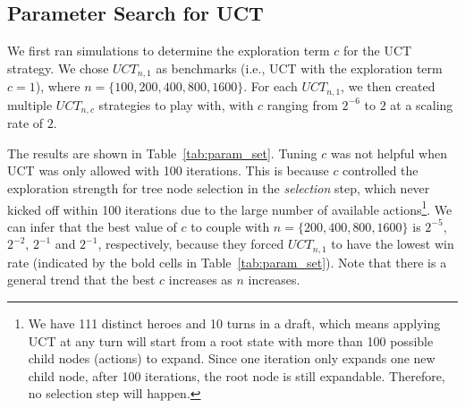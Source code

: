 \subsection{Parameter Search for UCT}

We first ran simulations to determine the exploration term $c$ for the UCT strategy. We chose $UCT_{n, 1}$ as benchmarks (i.e., UCT with the exploration term ${c=1}$), where ${n=\{100, 200, 400, 800, 1600\}}$. For each $UCT_{n,1}$, we then created multiple $UCT_{n, c}$ strategies to play with, with $c$ ranging from $2^{-6}$ to $2$ at a scaling rate of $2$.

The results are shown in Table~\ref{tab:param_set}. Tuning $c$ was not helpful when UCT was only allowed with 100 iterations. This is because $c$ controlled the exploration strength for tree node selection in the \textit{selection} step, which never kicked off within 100 iterations due to the large number of available actions\footnote{We have 111 distinct heroes and 10 turns in a draft, which means applying UCT at any turn will start from a root state with more than 100 possible child nodes (actions) to expand. Since one iteration only expands one new child node, after 100 iterations, the root node is still expandable. Therefore, no selection step will happen. }. We can infer that the best value of $c$ to couple with ${n=\{200, 400, 800, 1600\}}$ is $2^{-5}$, $2^{-2}$, $2^{-1}$ and $2^{-1}$, respectively, because they forced $UCT_{n, 1}$ to have the lowest win rate (indicated by the bold cells in Table~\ref{tab:param_set}). Note that there is a general trend that the best $c$ increases as $n$ increases.



